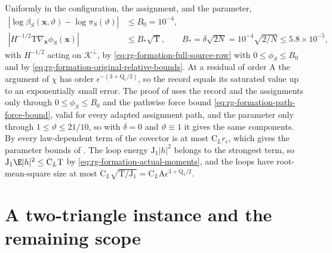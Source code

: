 Uniformly in the configuration, the assignment, and the parameter,
\begin{equation}
\begin{aligned}
|\log\beta_S(\mathbf x,\vartheta)-\log\pi_S(\vartheta)|&\le B_0=10^{-4},\\
|H^{-1/2}\mathrm T\nabla_{\mathbf x}\phi_S(\mathbf x)|&\le B_*\sqrt{\mathrm T},
\qquad
B_*=\delta\sqrt{2N}=10^{-4}\sqrt{2/N}\le5.8\times10^{-5},
\end{aligned}
\label{eq:rg-formation-source-saturation}
\end{equation}
with \(H^{-1/2}\) acting on \(\mathcal K^\perp\), by
\cref{eq:rg-formation-full-source-row} with \(0\le\phi_S\le B_0\) and by
\cref{eq:rg-formation-original-relative-bounds}. At a residual of order
\(\mathrm A\) the argument of \(\chi\) has order
\(\epsilon^{-(3+\mathrm Q_1/2)}\), so the record equals its saturated value up
to an exponentially small error. The proof of 
uses the record and the assignments only through \(0\le\phi_S\le B_0\) and the
pathwise force bound \cref{eq:rg-formation-path-force-bound}, valid for every
adapted assignment path, and the parameter only through
\(1\le\vartheta\le21/10\), so with \(\delta=0\) and \(\vartheta\equiv1\) it
gives the same components. By
every law-dependent term of the covector is at most \(\mathrm C_Lr_\epsilon\),
which gives the parameter bounds of .
The loop energy \(\mathrm J_1|h|^2\) belongs to the strongest term, so
\(\mathrm J_1\E|h|^2\le\mathrm C_L\mathrm T\) by
\cref{eq:rg-formation-actual-moments}, and the loops have root-mean-square size
at most \(\mathrm C_L\sqrt{\mathrm T/\mathrm J_1}
=\mathrm C_L\mathrm A\epsilon^{3+\mathrm Q_1/2}\). 

\section{A two-triangle instance and the remaining scope}
\label{sec:rg-formation-example-scope}

